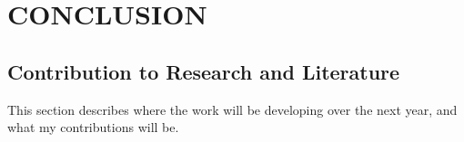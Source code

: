 
\chapter{CONCLUSION}\label{ch:conclusion}

\section{Contribution to Research and Literature} 

This section describes where the work will be developing over the next year, and what my contributions will be. 

%
%
%
